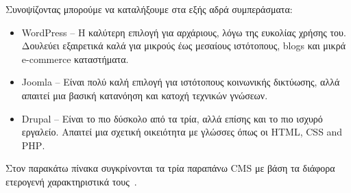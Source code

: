 \documentclass[12pt]{report}
\begin{document}
Συνοψίζοντας μπορούμε να καταλήξουμε στα εξής αδρά συμπεράσματα:
\begin{itemize}
\item \textlatin{WordPress} – Η καλύτερη επιλογή για αρχάριους, λόγω της ευκολίας χρήσης του. Δουλεύει εξαιρετικά καλά για μικρούς έως μεσαίους ιστότοπους, \textlatin{blogs} και μικρά \textlatin{e-commerce} καταστήματα.
\item \textlatin{Joomla} – Είναι πολύ καλή επιλογή για ιστότοπους κοινωνικής δικτύωσης, αλλά απαιτεί μια βασική κατανόηση και κατοχή τεχνικών γνώσεων.
\item \textlatin{Drupal} – Είναι το πιο δύσκολο από τα τρία, αλλά επίσης και το πιο ισχυρό εργαλείο. Απαιτεί μια σχετική οικειότητα με γλώσσες όπως οι \textlatin{HTML, CSS and PHP}.
\end{itemize}

Στον παρακάτω πίνακα συγκρίνονται τα τρία παραπάνω \textlatin{CMS} με βάση τα διάφορα ετερογενή χαρακτηριστικά τους~\cite{comparison_tables}.
\end{document}
